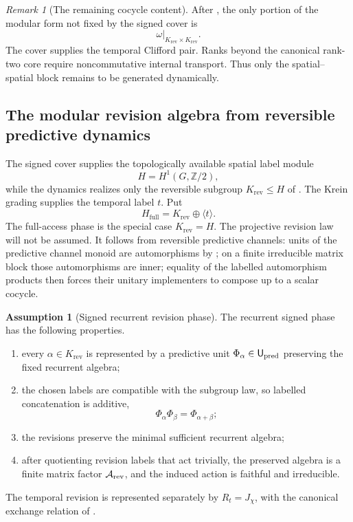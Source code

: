 \documentclass[11pt]{article}
\theoremstyle{definition}
\newtheorem{assumption}{Assumption}[section]
\theoremstyle{remark}
\newtheorem{remark}[theorem]{Remark}
\newcommand{\Z}{\mathbb{Z}}
\newcommand{\Hf}{H_{\mathrm{full}}}
\newcommand{\A}{\mathcal{A}}
\begin{document}
\begin{remark}[The remaining cocycle content]
\label{rem:only-spatial-block-remains}
After , the only portion of the modular form
not fixed by the signed cover is
\[
 \omega\big|_{K_{\mathrm{rev}}\times K_{\mathrm{rev}}}.
\]
The cover supplies the temporal Clifford pair.  Ranks beyond the canonical
rank-two core require noncommutative internal transport.  Thus only the spatial--spatial block remains to be generated dynamically.
\end{remark}

\subsection{The modular revision algebra from reversible predictive dynamics}
\label{subsec:modular-revision-algebra}

The signed cover supplies the topologically available spatial label module
\[
  H=H^1(G,\Z/2),
\]
while the dynamics realizes only the reversible subgroup
\(K_{\mathrm{rev}}\le H\) of
.  The Krein grading supplies the
temporal label \(t\).  Put
\[
  \Hf=K_{\mathrm{rev}}\oplus\langle t\rangle .
\]
The full-access phase is the special case \(K_{\mathrm{rev}}=H\).  The
projective revision law will not be assumed.  It follows from reversible
predictive channels: units of the predictive channel monoid are automorphisms by
; on a finite irreducible matrix block those
automorphisms are inner; equality of the labelled automorphism products then
forces their unitary implementers to compose up to a scalar cocycle.

\begin{assumption}[Signed recurrent revision phase]
\label{ass:signed-revision-phase}
\label{def:intrinsic-spatial-revisions}
The recurrent signed phase has the following properties.
\begin{enumerate}[label=\textup{(R\arabic*)},leftmargin=2.6em]
\item every \(\alpha\in K_{\mathrm{rev}}\) is represented by a predictive unit
      \(\Phi_\alpha\in\mathsf U_{\rm pred}\) preserving the fixed recurrent
      algebra;
\item the chosen labels are compatible with the subgroup law, so labelled
      concatenation is additive,
      \[
        \Phi_\alpha\Phi_\beta=\Phi_{\alpha+\beta};
      \]
\item the revisions preserve the minimal sufficient recurrent algebra;
\item after quotienting revision labels that act trivially, the preserved
      algebra is a finite matrix factor \(\A_{\rm rev}\), and the induced action
      is faithful and irreducible.
\end{enumerate}
The temporal revision is represented separately by
\(R_t=J_\chi\), with the canonical exchange relation of
.
\end{assumption}
\end{document}
